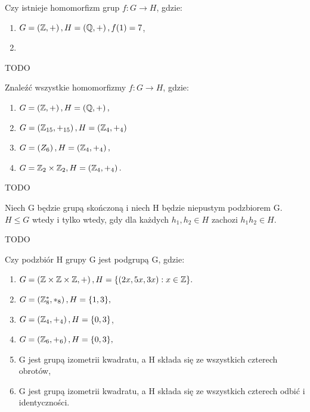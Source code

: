 \begin{problem}[11]

	Czy istnieje homomorfizm grup $f:G\rightarrow H$, gdzie:

	\begin{enumerate}[label=\alph*)]
		\item $G= \left( \mathbb{Z},+ \right), H=\left( \mathbb{Q},+ \right),f(1) = 7$,
		\item 
	\end{enumerate}
\end{problem}
\begin{solution}

	TODO	
\end{solution}
\begin{problem}[12]

	Znaleźć wszystkie homomorfizmy $f:G\rightarrow H$, gdzie:

	\begin{enumerate}[label=\alph*)]
		\item $G = \left( \mathbb{Z}, + \right), H = \left( \mathbb{Q}, + \right),$
		\item $G = \left( \mathbb{Z}_{15}, +_{15} \right), H = \left( \mathbb{Z}_{4}, +_{4} \right)$
		\item $G = \left( Z_{6} \right), H= \left( \mathbb{Z}_{4}, +_{4} \right),$ 
		\item $G = \mathbb{Z}_{2}\times \mathbb{Z}_{2}, H= \left( \mathbb{Z}_{4}, +_{4} \right) .$
	\end{enumerate}
\end{problem}
\begin{solution}

	TODO	
\end{solution}
\begin{problem}[13]
	Niech G będzie grupą skończoną i niech H będzie niepustym podzbiorem G. $H\le G$ wtedy i tylko wtedy, gdy dla każdych $h_1,h_2\in H$ zachozi $h_1h_2\in H.$
\end{problem}
\begin{solution}

	TODO
\end{solution}
\begin{problem}[14]

	Czy podzbiór H grupy G jest podgrupą G, gdzie:
	\begin{enumerate}[label=\alph*)]
		\item $G = \left( \mathbb{Z}\times\mathbb{Z}\times\mathbb{Z}, +\right), H=\{\left( 2x,5x,3x \right):x \in \mathbb{Z}\}.$
		\item $G = \left(\mathbb{Z}_{8}^{*}, *_{8}\right), H=\{1,3\},$
		\item $G = \left( \mathbb{Z}_{4}, +_{4} \right), H= \{0,3\} $,
		\item $G = \left( \mathbb{Z}_{6}, +_{6} \right), H= \{0,3\},$
		\item G jest grupą izometrii kwadratu, a H składa się ze wszystkich czterech obrotów,
		\item G jest grupą izometrii kwadratu, a H składa się ze wszystkich czterech odbić i identyczności.
	\end{enumerate}
\end{problem}

